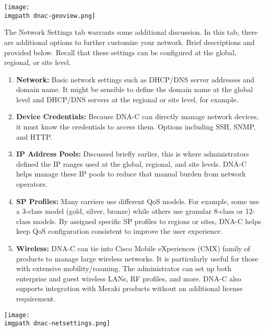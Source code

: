     \begin{minipage}[t]{\linewidth}
	  \centering
      \texttt{[image: \\imgpath dnac-geoview.png]}
    \end{minipage}

The Network Settings tab warrants some additional discussion. In this tab,
there are additional options to further customize your network. Brief
descriptions and provided below. Recall that these settings can be configured
at the global, regional, or site level.

\begin{enumerate}
  \item \textbf{Network:} Basic network settings such as DHCP/DNS server
  addresses and domain name. It might be sensible to define the domain name at
  the global level and DHCP/DNS servers at the regional or site level, for example.
  \item \textbf{Device Credentials:} Because DNA-C can directly manage network
  devices, it must know the credentials to access them. Options including SSH,
  SNMP, and HTTP.
  \item \textbf{IP Address Pools:} Discussed briefly earlier, this is where
  administrators defined the IP ranges used at the global, regional, and site
  levels. DNA-C helps manage these IP pools to reduce that manual burden from
  network operators.
  \item \textbf{SP Profiles:} Many carriers use different QoS models. For
  example, some use a 3-class model (gold, silver, bronze) while others use
  granular 8-class or 12-class models. By assigned specific SP profiles to
  regions or sites, DNA-C helps keep QoS configuration consistent to improve
  the user experience.
  \item \textbf{Wireless:} DNA-C can tie into Cisco Mobile eXperiences (CMX)
  family of products to manage large wireless networks. It is particularly
  useful for those with extensive mobility/roaming. The administrator can set
  up both enterprise and guest wireless LANs, RF profiles, and more. DNA-C
  also supports integration with Meraki products without an additional license requirement.
\end{enumerate}

    \begin{minipage}[t]{\linewidth}
	  \centering
      \texttt{[image: \\imgpath dnac-netsettings.png]}
    \end{minipage}

